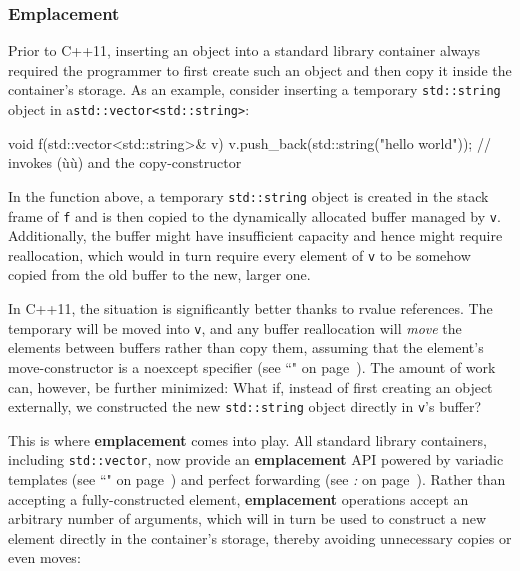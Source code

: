 \subsubsection[Emplacement]{Emplacement}\label{emplacement}

Prior to C++11, inserting an object into a standard library container
always required the programmer to first create such an object and then
copy it inside the container's storage. As an example, consider
inserting a temporary \texttt{std::string} object in a\linebreak[4]
\mbox{\texttt{std::vector<std::string>}}:

\begin{emcppslisting}
void f(std::vector<std::string>& v)
{
    v.push_back(std::string("hello world"));
        // invokes (ù{}ù) and the copy-constructor
}
\end{emcppslisting}

\noindent In the function above, a temporary \texttt{std::string} object is
created in the stack frame of \texttt{f} and is then copied to the
dynamically allocated buffer managed by \texttt{v}. Additionally, the
buffer might have insufficient capacity and hence might require
reallocation, which would in turn require every element of \texttt{v} to
be somehow copied from the old buffer to the new, larger one.

In C++11, the situation is significantly better thanks to
rvalue references. The temporary will be moved into
\texttt{v}, and any buffer reallocation will \emph{move} the elements
between buffers rather than copy them, assuming that the element's
move-constructor is a noexcept specifier (see ``" on page~\pageref{noexcept-specifier}). The amount of work
can, however, be further minimized: What if, instead of first creating
an object externally, we constructed the new \texttt{std::string} object
directly in \texttt{v}'s buffer?

This is where \textbf{emplacement} comes into play. All standard library
containers, including \texttt{std::vector}, now provide an
\textbf{emplacement} API powered by variadic templates (see ``" on page~\pageref{variadictemplate})
and perfect forwarding (see \textit{: } on page~\pageref{perfect-forwarding-for-generic-factory-functions}). Rather than accepting a
fully-constructed element, \textbf{emplacement} operations accept an
arbitrary number of arguments, which will in turn be used to construct a
new element directly in the container's storage, thereby avoiding
unnecessary copies or even moves:

